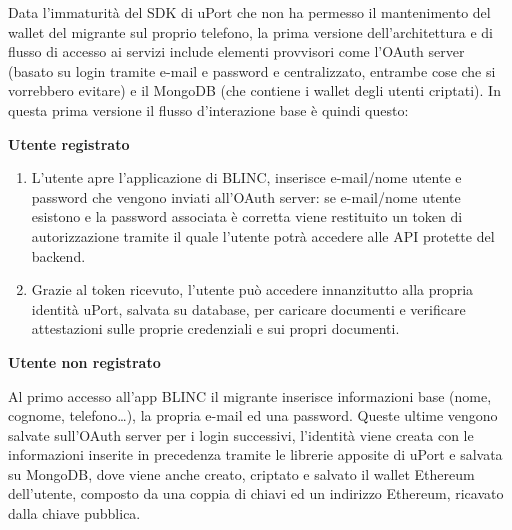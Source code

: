 Data l’immaturità del SDK di uPort che non ha permesso il mantenimento del wallet del migrante sul proprio telefono, la prima versione 
dell’architettura e di flusso di accesso ai servizi include elementi provvisori come l’OAuth server (basato su login tramite e-mail e password e centralizzato, 
entrambe cose che si vorrebbero evitare) e il MongoDB (che contiene i wallet degli utenti criptati).	
In questa prima versione il flusso d’interazione base è quindi questo:

\textbf{Utente registrato}

\begin{enumerate}
    \item L’utente apre l’applicazione di BLINC, inserisce e-mail/nome utente e password che vengono inviati all’OAuth server:
    se e-mail/nome utente esistono e la password associata è corretta viene restituito un token di autorizzazione tramite il quale l’utente
    potrà accedere alle API protette del backend.
    \item Grazie al token ricevuto, l’utente può accedere innanzitutto alla propria identità uPort, salvata su database, 
    per caricare documenti e verificare attestazioni sulle proprie credenziali e sui propri documenti.
\end{enumerate}

\textbf{Utente non registrato}

Al primo accesso all’app BLINC il migrante inserisce informazioni base (nome, cognome, telefono…),
la propria e-mail ed una password. Queste ultime vengono salvate sull’OAuth server per i login successivi, 
l’identità viene creata con le informazioni inserite in precedenza tramite le librerie apposite di uPort 
e salvata su MongoDB, dove viene anche creato, criptato e salvato il wallet Ethereum dell’utente,
composto da una coppia di chiavi ed un indirizzo Ethereum, ricavato dalla chiave pubblica.
